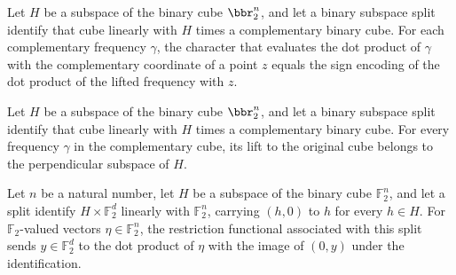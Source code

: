 \begin{theorem}
\label{FABL.BinarySubspaceSplit.character_eq_liftFrequency}
\leanok
{}
Let $H$ be a subspace of the binary cube $\bbr_2^n$, and let a binary subspace split
identify that cube linearly with $H$ times a complementary binary cube. For each
complementary frequency $\gamma$, the character that evaluates the dot product of
$\gamma$ with the complementary coordinate of a point $z$ equals the sign encoding of
the dot product of the lifted frequency with $z$.
\end{theorem}

\begin{theorem}
\label{FABL.BinarySubspaceSplit.liftFrequency_mem_perpendicularSubspace}
\leanok
{}
Let $H$ be a subspace of the binary cube $\bbr_2^n$, and let a binary subspace split
identify that cube linearly with $H$ times a complementary binary cube. For every
frequency $\gamma$ in the complementary cube, its lift to the original cube belongs to
the perpendicular subspace of $H$.
\end{theorem}

\begin{definition}
\label{FABL.BinarySubspaceSplit.restrictionFunctional}
\leanok
{}
Let $n$ be a natural number, let $H$ be a subspace of the binary cube $\mathbb{F}_2^n$, and
let a split identify $H \times \mathbb{F}_2^d$ linearly with $\mathbb{F}_2^n$, carrying $(h,0)$ to
$h$ for every $h \in H$. For $\mathbb{F}_2$-valued vectors $\eta \in \mathbb{F}_2^n$, the restriction
functional associated with this split sends $y \in \mathbb{F}_2^d$ to the dot product of $\eta$
with the image of $(0,y)$ under the identification.
\end{definition}

